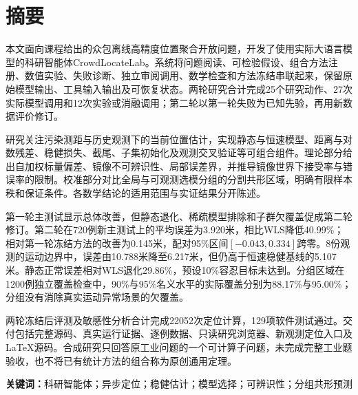 \section*{摘要}
本文面向课程给出的众包离线高精度位置聚合开放问题，开发了使用实际大语言模型的科研智能体CrowdLocateLab。系统将问题阅读、可检验假设、组合方法注册、数值实验、失败诊断、独立审阅调用、数学检查和方法冻结串联起来，保留原始模型输出、工具输入输出及可恢复状态。两轮研究合计完成25个研究动作、27次实际模型调用和12次实验或消融调用；第二轮以第一轮失败为已知先验，再用新数据评价修订。

研究关注污染测距与历史观测下的当前位置估计，实现静态与恒速模型、距离与对数残差、稳健损失、截尾、子集初始化及观测交叉验证等可组合组件。理论部分给出自加权标量偏差、镜像不可辨识性、局部误差界，并推导镜像世界下接受率与错误率的限制。校准部分对比全局与可观测选模分组的分割共形区域，明确有限样本秩和保证条件。各数学结论的适用范围与实证结果分开陈述。

第一轮主测试显示总体改善，但静态退化、稀疏模型排除和子群欠覆盖促成第二轮修订。第二轮在720例新主测试上的平均误差为3.920米，相比WLS降低40.99\%；相对第一轮冻结方法的改善为0.145米，配对95\%区间$[-0.043,0.334]$跨零。8份观测的运动边界中，误差由10.788米降至6.217米，但仍高于恒速稳健基线的5.107米。静态正常误差相对WLS退化29.86\%，预设10\%容忍目标未达到。分组区域在1200例独立覆盖检查中，90\%与95\%名义水平的实际覆盖分别为88.17\%与95.00\%；分组没有消除真实运动异常场景的欠覆盖。

两轮冻结后评测及敏感性分析合计完成22052次定位计算，129项软件测试通过。交付包括完整源码、真实运行证据、逐例数据、只读研究浏览器、新观测定位入口及LaTeX源码。合成研究只回答原工业问题的一个可计算子问题，未完成完整工业题验收，也不将已有统计方法的组合称为原创通用定理。

\vspace{4mm}
\noindent\textbf{关键词：}科研智能体；异步定位；稳健估计；模型选择；可辨识性；分组共形预测
